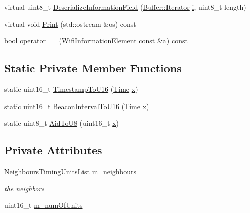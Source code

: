 \begin{DoxyCompactItemize}
\item 
virtual uint8\+\_\+t \hyperlink{classns3_1_1dot11s_1_1IeBeaconTiming_a5149f425c361a13f0b17083b71d46959}{Deserialize\+Information\+Field} (\hyperlink{classns3_1_1Buffer_1_1Iterator}{Buffer\+::\+Iterator} \hyperlink{lte__uplink__power__control_8m_a6f6ccfcf58b31cb6412107d9d5281426}{i}, uint8\+\_\+t length)
\item 
virtual void \hyperlink{classns3_1_1dot11s_1_1IeBeaconTiming_a6fe8020dd71fef31e239bbfed3f9337f}{Print} (std\+::ostream \&os) const 
\item 
bool \hyperlink{classns3_1_1dot11s_1_1IeBeaconTiming_ac3a3cdb089f611266aae7f2686853ff8}{operator==} (\hyperlink{classns3_1_1WifiInformationElement}{Wifi\+Information\+Element} const \&a) const 
\end{DoxyCompactItemize}
\subsection*{Static Private Member Functions}
\begin{DoxyCompactItemize}
\item 
static uint16\+\_\+t \hyperlink{classns3_1_1dot11s_1_1IeBeaconTiming_adbd32edc0693151e4a303edc46810baf}{Timestamp\+To\+U16} (\hyperlink{classns3_1_1Time}{Time} \hyperlink{lte__link__budget__x2__handover__measures_8m_a9336ebf25087d91c818ee6e9ec29f8c1}{x})
\item 
static uint16\+\_\+t \hyperlink{classns3_1_1dot11s_1_1IeBeaconTiming_a3786fc43fe97f2692a3c040440e55a3d}{Beacon\+Interval\+To\+U16} (\hyperlink{classns3_1_1Time}{Time} \hyperlink{lte__link__budget__x2__handover__measures_8m_a9336ebf25087d91c818ee6e9ec29f8c1}{x})
\item 
static uint8\+\_\+t \hyperlink{classns3_1_1dot11s_1_1IeBeaconTiming_ab9feab28d4b88a5f7ef99b981b6025b3}{Aid\+To\+U8} (uint16\+\_\+t \hyperlink{lte__link__budget__x2__handover__measures_8m_a9336ebf25087d91c818ee6e9ec29f8c1}{x})
\end{DoxyCompactItemize}
\subsection*{Private Attributes}
\begin{DoxyCompactItemize}
\item 
\hyperlink{group__dot11s_ga8dbec40aea7e1014f0af23de3b31a78c}{Neighbours\+Timing\+Units\+List} \hyperlink{classns3_1_1dot11s_1_1IeBeaconTiming_acde5a981cb6e4d2afb319d6c879408b9}{m\+\_\+neighbours}
\begin{DoxyCompactList}\small\item\em the neighbors \end{DoxyCompactList}\item 
uint16\+\_\+t \hyperlink{classns3_1_1dot11s_1_1IeBeaconTiming_a71584e499b5c7ff1679953f8e7c58cdc}{m\+\_\+num\+Of\+Units}
\end{DoxyCompactItemize}
